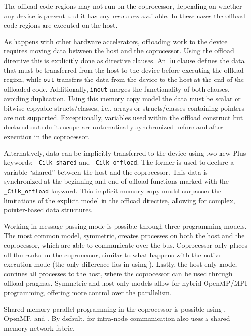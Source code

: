 \documentclass[../thesis]{subfiles}
\begin{document}
	The offload code regions may not run on the coprocessor, depending on whether any device is present and it has any resources available. In these cases the offload code regions are executed on the host.

	As happens with other hardware accelerators, offloading work to the device requires moving data between the host and the coprocessor. Using the offload directive this is explicitly done as directive clauses. An \texttt{in} clause defines the data that must be transferred from the host to the device before executing the offload region, while \texttt{out} transfers the data from the device to the host at the end of the offloaded code. Additionally, \texttt{inout} merges the functionality of both clauses, avoiding duplication. Using this memory copy model the data must be scalar or bitwise copyable structs/classes, i.e., arrays or structs/classes containing pointers are not supported. Exceptionally, variables used within the offload construct but declared outside its scope are automatically synchronized before and after execution in the coprocessor.

	Alternatively, data can be implicitly transferred to the device using two new \intel\cilk Plus keywords: \texttt{\_Cilk\_shared} and \texttt{\_Cilk\_offload}. The former is used to declare a variable ``shared'' between the host and the coprocessor. This data is synchronized at the beginning and end of offload functions marked with the \texttt{\_Cilk\_offload} keyword. This implicit memory copy model surpasses the limitations of the explicit model in the offload directive, allowing for complex, pointer-based data structures.

	Working in message passing mode is possible through three \mpi programming models. The most common model, symmetric, creates \mpi processes on both the host and the coprocessor, which are able to communicate over the \pcie bus. Coprocessor-only places all the \mpi ranks on the coprocessor, similar to what happens with the native execution mode (the only difference lies in using \mpi). Lastly, the host-only model confines all processes to the host, where the coprocessor can be used through offload pragmas. Symmetric and host-only models allow for hybrid OpenMP/MPI programming, offering more control over the parallelism.

	Shared memory parallel programming in the coprocessor is possible using \pthreads, OpenMP, \intel\tbb and \intel\cilk. By default, for intra-node communication \mpi also uses a shared memory network fabric.
\end{document}
